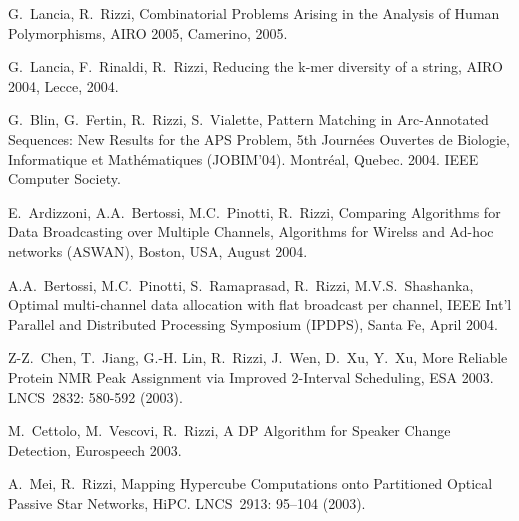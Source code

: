 \begin{etaremune}
\vspace{-1.8mm}
  \item {G.~Lancia, R.~Rizzi},
   \newblock Combinatorial Problems Arising in the Analysis of Human Polymorphisms,
   \newblock AIRO 2005, Camerino, 2005.

\vspace{-1.8mm}
  \item {G.~Lancia, F.~Rinaldi, R.~Rizzi},
   \newblock Reducing the k-mer diversity of a string,
   \newblock AIRO 2004, Lecce, 2004.

\vspace{-1.8mm}
  \item {G.~Blin, G.~Fertin, R.~Rizzi, S.~Vialette},
   \newblock Pattern Matching in Arc-Annotated Sequences: New Results for the APS Problem,
   \newblock 5th Journ\'ees Ouvertes de Biologie, Informatique et Math\'ematiques (JOBIM'04).
   \newblock Montr\'eal, Quebec. 2004.
   \newblock IEEE Computer Society.

\vspace{-1.8mm}
  \item {E.~Ardizzoni, A.A.~Bertossi, M.C.~Pinotti, R.~Rizzi},
   \newblock Comparing Algorithms for Data Broadcasting over Multiple Channels,
   \newblock Algorithms for Wirelss and Ad-hoc networks (ASWAN),
   \newblock Boston, USA, August 2004.

\vspace{-1.8mm}
  \item {A.A.~Bertossi, M.C.~Pinotti, S.~Ramaprasad, R.~Rizzi, M.V.S.~Shashanka},
   \newblock Optimal multi-channel data allocation with flat broadcast per channel,
   \newblock IEEE Int’l Parallel and Distributed Processing Symposium (IPDPS),
   \newblock Santa Fe, April 2004.

\vspace{-1.8mm}
  \item {Z-Z.~Chen, T.~Jiang, G.-H. Lin, R.~Rizzi, J.~Wen, D.~Xu, Y.~Xu},
   \newblock More Reliable Protein NMR Peak Assignment via Improved 2-Interval Scheduling,
   \newblock ESA 2003.
   \newblock LNCS~2832: 580-592 (2003).

\vspace{-1.8mm}
  \item {M.~Cettolo, M.~Vescovi, R.~Rizzi},
   \newblock  A DP Algorithm  for Speaker Change Detection,
   \newblock Eurospeech 2003.

\vspace{-1.8mm}
  \item {A.~Mei, R.~Rizzi},
   \newblock Mapping Hypercube Computations onto Partitioned Optical Passive Star Networks,
   \newblock HiPC.
   \newblock  LNCS~2913: 95--104 (2003).


\end{etaremune}
